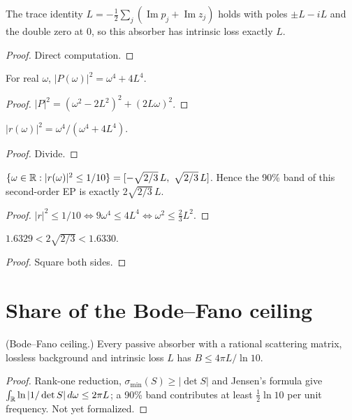 \begin{lemma}\label{lem:P2_trace}
\leanok
{}
The trace identity $L=-\tfrac12\sum_j(\operatorname{Im}p_j+\operatorname{Im}z_j)$ holds with poles
$\pm L-iL$ and the double zero at $0$, so this absorber has intrinsic loss exactly $L$.
\end{lemma}
\begin{proof}\leanok
Direct computation.
\end{proof}

\begin{lemma}\label{lem:P2_normSq}
\leanok
{}
For real $\omega$, $|P(\omega)|^2=\omega^4+4L^4$.
\end{lemma}
\begin{proof}\leanok
$|P|^2=(\omega^2-2L^2)^2+(2L\omega)^2$.
\end{proof}

\begin{lemma}\label{lem:r2_normSq}
\leanok
{}
$|r(\omega)|^2=\omega^4/(\omega^4+4L^4)$.
\end{lemma}
\begin{proof}\leanok
Divide.
\end{proof}

\begin{theorem}\label{thm:band_N2}
\leanok
{}
$\{\omega\in\mathbb{R}:|r(\omega)|^2\le 1/10\}=[-\sqrt{2/3}\,L,\ \sqrt{2/3}\,L]$. Hence the 90\% band of this
second-order EP is exactly $2\sqrt{2/3}\,L$.
\end{theorem}
\begin{proof}\leanok
$|r|^2\le 1/10\iff 9\omega^4\le 4L^4\iff \omega^2\le \tfrac23 L^2$.
\end{proof}

\begin{lemma}\label{lem:width_N2_bounds}
\leanok
$1.6329<2\sqrt{2/3}<1.6330$.
\end{lemma}
\begin{proof}\leanok
Square both sides.
\end{proof}

\chapter{Share of the Bode--Fano ceiling}

\begin{theorem}\label{thm:bode_fano}
(Bode--Fano ceiling.) Every passive absorber with a rational scattering matrix, lossless background
and intrinsic loss $L$ has $B\le 4\pi L/\ln 10$.
\end{theorem}
\begin{proof}
Rank-one reduction, $\sigma_{\min}(S)\ge|\det S|$ and Jensen's formula give
$\int_{\mathbb{R}}\ln|1/\det S|\,d\omega\le 2\pi L$; a 90\% band contributes at least $\tfrac12\ln 10$ per unit
frequency. Not yet formalized.
\end{proof}


